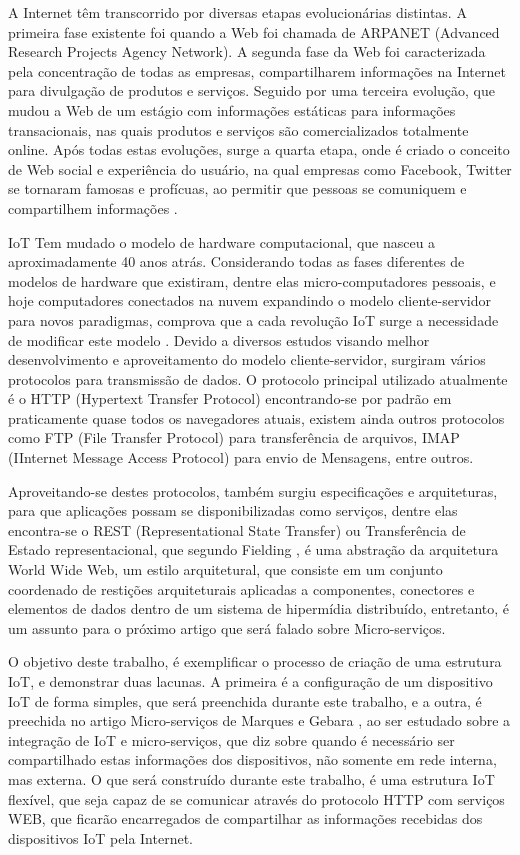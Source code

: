 \documentclass[journal]{IEEEtran}
\begin{document}
A Internet têm transcorrido por diversas etapas evolucionárias distintas. A primeira fase existente foi quando a Web foi chamada de ARPANET (Advanced Research Projects Agency Network). A segunda fase da Web foi caracterizada pela concentração de todas as empresas, compartilharem informações na Internet para divulgação de produtos e serviços. Seguido por uma terceira evolução, que mudou a Web de um estágio com informações estáticas para informações transacionais, nas quais produtos e serviços são comercializados totalmente online. Após todas estas evoluções, surge a quarta etapa, onde é criado o conceito de Web social e experiência do usuário, na qual empresas como Facebook, Twitter se tornaram famosas e profícuas, ao permitir que pessoas se comuniquem e compartilhem informações \cite[p.~6]{Evans}.

IoT Tem mudado o modelo de hardware computacional, que nasceu a aproximadamente 40 anos atrás. Considerando todas as fases diferentes de modelos de hardware que existiram, dentre elas micro-computadores pessoais, e hoje computadores conectados na nuvem expandindo o modelo cliente-servidor para novos paradigmas, comprova que a cada revolução IoT surge a necessidade de modificar este modelo \cite[p.~6]{dzonevoltreeiot}. Devido a diversos estudos visando melhor desenvolvimento e aproveitamento do modelo cliente-servidor, surgiram vários protocolos para transmissão de dados. O protocolo principal utilizado atualmente é o HTTP (Hypertext Transfer Protocol) encontrando-se por padrão em praticamente quase todos os navegadores atuais, existem ainda outros protocolos como FTP (File Transfer Protocol) para transferência de arquivos, IMAP (IInternet Message Access Protocol) para envio de Mensagens, entre outros. 

Aproveitando-se destes protocolos, também surgiu especificações e arquiteturas, para que aplicações possam se disponibilizadas como serviços, dentre elas encontra-se o REST (Representational State Transfer) ou Transferência de Estado representacional, que segundo Fielding \cite{roythomasfielding2017}, é uma abstração da arquitetura World Wide Web, um estilo  arquitetural, que consiste em um conjunto coordenado de restições arquiteturais aplicadas a componentes, conectores e elementos de dados dentro de um sistema de hipermídia distribuído, entretanto, é um assunto para o próximo artigo que será falado sobre Micro-serviços.

O objetivo deste trabalho, é exemplificar o processo de criação de uma estrutura IoT, e demonstrar duas lacunas. A primeira é a configuração de um dispositivo IoT de forma simples, que será preenchida durante este trabalho, e a outra, é preechida no artigo Micro-serviços de Marques e Gebara \cite{MarquesMunif}, ao ser estudado sobre a integração de IoT e micro-serviços, que diz sobre quando é necessário ser compartilhado estas informações dos dispositivos, não somente em rede interna, mas externa. O que será construído durante este trabalho, é uma estrutura IoT flexível, que seja capaz de se comunicar através do protocolo HTTP com serviços WEB, que ficarão encarregados de compartilhar as informações recebidas dos dispositivos IoT pela Internet.
\end{document}
